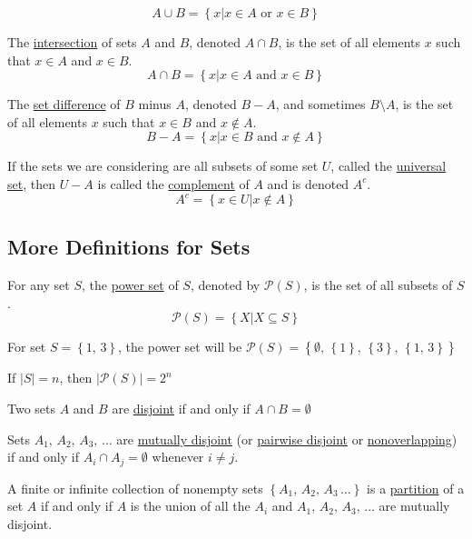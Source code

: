 $$A\cup B = \left\{x | x \in A \text{ or } x\in B\right\}$$

The \underline{intersection} of sets $A$ and $B$, denoted $A\cap B$, is the set of all elements $x$ such that $x\in A$ and $x\in B$.
$$A\cap B = \left\{x | x\in A \text{ and } x\in B\right\}$$

The \underline{set difference} of $B$ minus $A$, denoted $B-A$, and sometimes $B \setminus A$, is the set of all elements $x$ such that $x\in B$ and $x\notin A$.
$$B - A = \left\{x | x\in B \text{ and } x\notin A\right\}$$

If the sets we are considering are all subsets of some set $U$, called the \underline{universal set}, then $U - A$ is called the \underline{complement} of $A$ and is denoted $A^c$.
$$A^c = \left\{x\in U | x\notin A\right\}$$

\subsection{More Definitions for Sets}
\begin{definition}
    For any set $S$, the \underline{power set} of $S$, denoted by $\mathcal{P}(S)$, is the set of all subsets of $S$.
    $$\mathcal{P}(S) = \left\{X | X\subseteq S\right\}$$
\end{definition}

\begin{example}
    For set $S = \left\{1,\,3\right\}$, the power set will be $\mathcal{P}(S) = \left\{\emptyset,\,\left\{1\right\},\,\left\{3\right\},\,\left\{1,\,3\right\}\right\}$
\end{example}

If $|S| = n$, then $|\mathcal{P}(S)| = 2^n$

\begin{definition}
    Two sets $A$ and $B$ are \underline{disjoint} if and only if $A\cap B = \emptyset$
\end{definition}

\begin{definition}
    Sets $A_1,\,A_2,\,A_3,\,\dots$ are \underline{mutually disjoint} (or \underline{pairwise disjoint} or \underline{nonoverlapping}) if and only if $A_i \cap A_j = \emptyset$ whenever $i\neq j$.
\end{definition}

\begin{definition}
    A finite or infinite collection of nonempty sets $\left\{A_1,\,A_2,\,A_3\,\dots\right\}$ is a \underline{partition} of a set $A$ if and only if $A$ is the union of all the $A_i$ and $A_1,\,A_2,\,A_3,\,\dots$ are mutually disjoint.
\end{definition}

